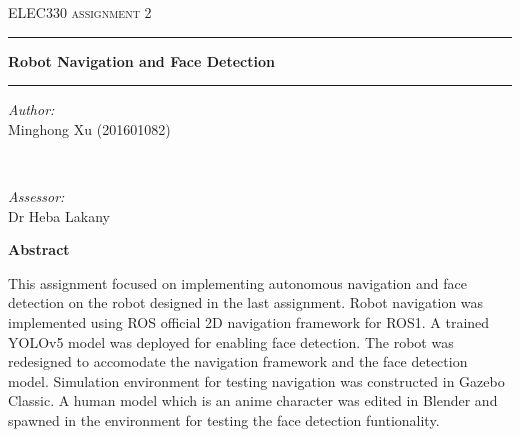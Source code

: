 \begin{titlepage}
\center %



\vspace{6mm}

\textsc{\Large ELEC330 assignment 2}

\vspace{6mm}

\rule[6mm]{\linewidth}{0.75mm}
{\LARGE\bfseries Robot Navigation and Face Detection}
\rule[-3mm]{\linewidth}{0.75mm}

\vspace{8mm}

\begin{minipage}{0.4\textwidth}
   \begin{flushleft}
      \emph{Author:} \\
      Minghong Xu (201601082)
   \end{flushleft}
\end{minipage}
~
\begin{minipage}{0.4\textwidth}
   \begin{flushright}
      \emph{Assessor:} \\
      Dr Heba Lakany
   \end{flushright}
\end{minipage}

\vspace{8mm}

\textbf{Abstract}
\begin{spacing}{0.8}
\parbox{0.85\textwidth}{
   This assignment focused on implementing autonomous navigation and face detection on the robot designed in the last assignment. Robot navigation was implemented using ROS official 2D navigation framework for ROS1. A trained YOLOv5 model was deployed for enabling face detection. The robot was redesigned to accomodate the navigation framework and the face detection model. Simulation environment for testing navigation was constructed in Gazebo Classic. A human model which is an anime character was edited in Blender and spawned in the environment for testing the face detection funtionality.
}
\end{spacing}

\vfill


\end{titlepage}
